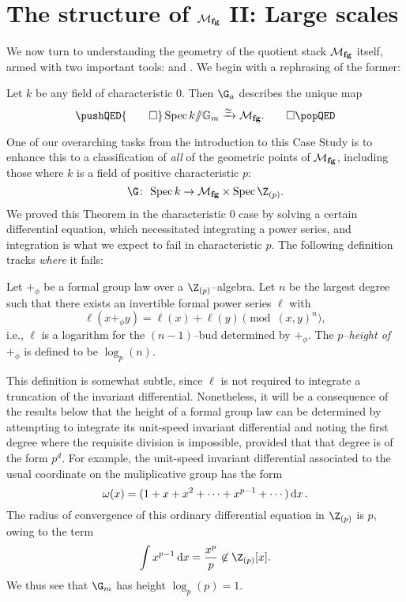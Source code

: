 \section{The structure of \texorpdfstring{\(\mathcal{M}_{\mathbf{fg}}\)}{Mfg} II: Large scales}\label{MfgII:LargeScales}

We now turn to understanding the geometry of the quotient stack \(\mathcal{M}_{\mathbf{fg}}\) itself, armed with two important tools:  and .  We begin with a rephrasing of the former:

\begin{theorem}\label{RationalGeometricPointsOfMfg}
Let \(k\) be any field of characteristic \(0\).  Then \(\G_a\) describes the unique map
\[\pushQED{\qed}
\Spec k \mmod \Gm \xrightarrow{\simeq} \moduli{fg}. \qedhere
\popQED\]
\end{theorem}

One of our overarching tasks from the introduction to this Case Study is to enhance this to a classification of \emph{all} of the geometric points of \(\mathcal{M}_{\mathbf{fg}}\), including those where \(k\) is a field of positive characteristic \(p\): \[\G\co \Spec k \to \moduli{fg} \times \Spec \Z_{(p)}.\]  We proved this Theorem in the characteristic \(0\) case by solving a certain differential equation, which necessitated integrating a power series, and integration is what we expect to fail in characteristic \(p\).  The following definition tracks \emph{where} it fails:
\begin{definition}\label{HeightDefn}
Let \(+_\phi\) be a formal group law over a \(\Z_{(p)}\)--algebra.  Let \(n\) be the largest degree such that there exists an invertible formal power series \(\ell\) with \[\ell(x +_\phi y) = \ell(x) + \ell(y) \pmod{(x, y)^{n}},\] i.e., \(\ell\) is a logarithm for the \((n-1)\)--bud determined by \(+_\phi\).  The \textit{\(p\)--height of \(+_\phi\)} is defined to be \(\log_p(n)\).
\end{definition}

\begin{example}
This definition is somewhat subtle, since \(\ell\) is not required to integrate a truncation of the invariant differential.  Nonetheless, it will be a consequence of the results below that the height of a formal group law can be determined by attempting to integrate its unit-speed invariant differential and noting the first degree where the requisite division is impossible, provided that that degree is of the form \(p^d\).  For example, the unit-speed invariant differential associated to the usual coordinate on the muliplicative group has the form \[\omega(x) = (1 + x + x^2 + \cdots + x^{p-1} + \cdots) \operatorname{d\mathit{x}}.\]  The radius of convergence of this ordinary differential equation in \(\Z_{(p)}\) is \(p\), owing to the term \[\int x^{p-1} \dx = \frac{x^p}{p} \not\in \Z_{(p)}[x].\]  We thus see that \(\G_m\) has height \(\log_p(p) = 1\).
\end{example}

